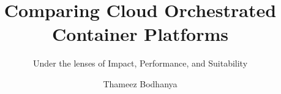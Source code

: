 \documentclass[aspectratio=169,10pt]{uu-beamer}
\title{Comparing Cloud Orchestrated Container Platforms}
\subtitle{Under the lenses of Impact, Performance, and Suitability}
\author[TA. Bodhanya]{Thameez Bodhanya}
\institute[UU]{Uppsala Universitet}
\begin{document}
\logopage

\titlepage








\end{document}
